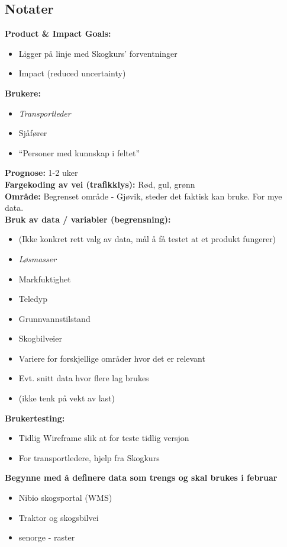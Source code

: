 \subsection*{Notater}
\textbf{Product \& Impact Goals:} 
\begin{itemize}
    \item Ligger på linje med Skogkurs'
forventninger
\item Impact (reduced uncertainty)
\end{itemize}
\textbf{Brukere:} 
\begin{itemize}
    \item \emph{Transportleder}
    \item Sjåfører
    \item ``Personer med kunnskap i feltet''
\end{itemize}
\textbf{Prognose:} 1-2 uker\\
\textbf{Fargekoding av vei (trafikklys):} Rød, gul, grønn\\
\textbf{Område:} Begrenset område - Gjøvik, steder det faktisk kan
bruke. For mye data.\\
\textbf{Bruk av data / variabler (begrensning):}
\begin{itemize}
    \item (Ikke konkret rett valg av data, mål å få testet at et produkt fungerer)
    \item \emph{Løsmasser}
    \item Markfuktighet
    \item Teledyp
    \item Grunnvannstilstand
    \item Skogbilveier
    \item Variere for forskjellige områder hvor det er relevant
    \item Evt. snitt data hvor flere lag brukes
    \item (ikke tenk på vekt av last)
\end{itemize}

\textbf{Brukertesting:} \\
\begin{itemize}
    \item Tidlig Wireframe slik at for teste tidlig versjon
    \item For transportledere, hjelp fra Skogkurs
\end{itemize}
\textbf{Begynne med å definere data som trengs og skal brukes i februar}
\begin{itemize}
    \item Nibio skogsportal (WMS)
    \item Traktor og skogsbilvei
    \item senorge - raster
\end{itemize}


